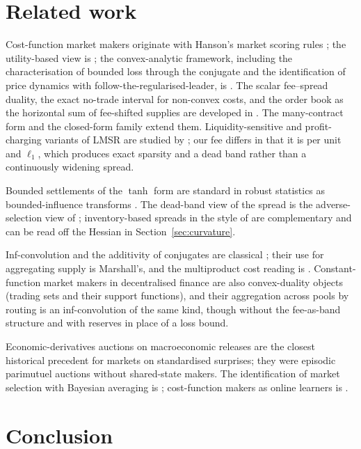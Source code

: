 \documentclass[11pt]{article}
\theoremstyle{definition}
\theoremstyle{remark}
\begin{document}
\section{Related work}\label{sec:related}

Cost-function market makers originate with Hanson's market scoring rules \citep{hanson2003,hanson2007}; the
utility-based view is \citet{chen2007utility}; the convex-analytic framework, including the characterisation of
bounded loss through the conjugate and the identification of price dynamics with follow-the-regularised-leader, is
\citet{abernethy2013}. The scalar fee--spread duality, the exact no-trade interval for non-convex costs, and the order book as the
horizontal sum of fee-shifted supplies are developed in \citet{cotton2026nonconvex}. The many-contract form and the
closed-form family extend them. Liquidity-sensitive and profit-charging variants of LMSR are studied by
\citet{othman2013}; our fee differs in that it is per unit and $\ell_1$, which produces exact sparsity and a dead
band rather than a continuously widening spread.

Bounded settlements of the $\tanh$ form are standard in
robust statistics as bounded-influence transforms \citep{huber1981}. The dead-band view of the spread is the
adverse-selection view of \citet{glosten1985}; inventory-based spreads in the style of \citet{avellaneda2008} are
complementary and can be read off the Hessian in Section~\ref{sec:curvature}.

Inf-convolution and the additivity
of conjugates are classical \citep{rockafellar1970}; their use for aggregating supply is Marshall's, and the
multiproduct cost reading is \citet{baumol1982}. Constant-function market makers in decentralised finance
\citep{angeris2020} are also convex-duality objects (trading sets and their support functions), and their
aggregation across pools by routing \citep{angeris2022} is an inf-convolution of the same kind, though without
the fee-as-band structure and with reserves in place of a loss bound.

Economic-derivatives auctions on
macroeconomic releases \citep{gurkaynak2005} are the closest historical precedent for markets on standardised
surprises; they were episodic parimutuel auctions without shared-state makers. The identification of market
selection with Bayesian averaging is \citet{blume1992}; cost-function makers as online learners is
\citet{chen2010}.

\section{Conclusion}
\end{document}
